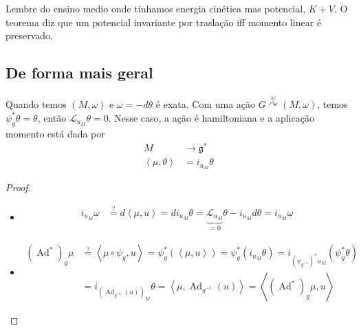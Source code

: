 \begin{remark}\leavevmode
	Lembre do ensino medio onde tinhamos energia cinética mas potencial, $K+V$.  O teorema diz que um potencial invariante por traslação iff momento linear é preservado.
\end{remark}

\subsection{De forma mais geral}

Quando temos $(M,\omega)$ e $\omega=-d\theta$ é exata. Com uma ação $G\overset{\psi}{\curvearrowright}(M,\omega)$, temos $\psi_g^*\theta=\theta$, então $\mathcal{L}_{u_{M}}\theta=0$. Nesse caso, a ação é hamiltoniana e a aplicação momento está dada por
\begin{align*}
	M &\longrightarrow \mathfrak{g}^* \\
	\left<\mu,\theta\right>  &=i_{u_{M}}\theta
\end{align*}

\begin{proof}\leavevmode
	\begin{itemize}
	\item 
		 \begin{align*}
			i_{u_M}\omega&\overset{?}{=} d \left<\mu,u\right> =di_{u_M}\theta=\underbrace{\mathcal{L}_{u_{M}}}_{=0}\theta-i_{u_{M}}d\theta=i_{u_{M}}\omega
		\end{align*}
	\item 
		\begin{align*}
			(\operatorname{Ad}^*)_g\mu&\overset{?}{=}\left<\mu\circ \psi_g,u\right> =\psi^* _g(\left<\mu,u\right> )=\psi^* _g(i_{u_M}\theta)=i_{(\psi_{g^{-1}})^*u_M}(\psi_g^*\theta)\\
			&=i_{(\operatorname{Ad}_{g^{-1}}(u))_M}\theta=\left<\mu,\operatorname{Ad}_{g^{-1}}(u)\right> =\left<(\operatorname{Ad}^*)_g\mu,u\right> 
		\end{align*}
	\end{itemize}
\end{proof}

